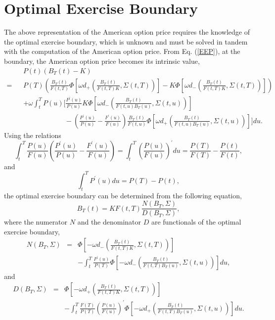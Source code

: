 \documentclass[12pt]{article}
\begin{document}
  \section{Optimal Exercise Boundary}

    The above representation of the American option price requires the knowledge of the optimal
    exercise boundary, which is unknown and must be solved in tandem with the computation of the American
    option price. From Eq. (\ref{EEP}), at the boundary, the American option price becomes its intrinsic
    value,
    \begin{eqnarray}
       \label{Boundary}
       && P(t)\left(B_T(t)-K\right)\nonumber\\
      =&& P(T)\left(\frac{B_T(t)}{F(t,T)}\Phi\left[\omega d_+\left(\frac{B_T(t)}{F(t,T)K},\Sigma(t,T)\right)\right]
                                                      -K\Phi\left[\omega d_-\left(\frac{B_T(t)}{F(t,T)K},\Sigma(t,T)\right)\right]\right)\nonumber\\
       &&+\omega\int_t^TP(u)\Bigg[\frac{P^{\prime}(u)}{P(u)} K
       \Phi\left[\omega d_-\left(\frac{B_T(t)}{F(t,u)B_T(u)}, \Sigma(t,u)\right)\right] \nonumber\\
       &&\quad\quad\quad\quad\quad\quad - \left(\frac{P^{\prime}(u)}{P(u)}-\frac{F^{\prime}(u)}{F(u)}\right)
       \frac{B_T(t)}{F(t,u)}\Phi\left[\omega d_+\left(\frac{B_T(t)}{F(t,u)B_T(u)}, \Sigma(t,u)\right)\right] \Bigg]du.
    \end{eqnarray}
    Using the relations
    \begin{equation}
     \int_t^T \frac{P(u)}{F(u)}\left(\frac{P^{\prime}(u)}{P(u)}-\frac{F^{\prime}(u)}{F(u)}\right)
     = \int_t^T\left(\frac{P(u)}{F(u)}\right)^{\prime}du=\frac{P(T)}{F(T)} - \frac{P(t)}{F(t)},
    \end{equation}
    and
    \begin{equation}
      \int_t^TP^{\prime}(u)du=P(T)-P(t),
    \end{equation}
    the optimal exercise boundary can be determined from the following equation,
    \begin{equation}
      B_T(t)=KF(t,T)\frac{N\left(B_T, \Sigma\right)}{D\left(B_T, \Sigma\right)},
    \end{equation}
    where the numerator $N$ and the denominator $D$ are functionals of the optimal exercise boundary,
    \begin{eqnarray}
      N\left(B_T, \Sigma\right)&=&\Phi\left[-\omega d_-\left(\frac{B_T(t)}{F(t,T)K},\Sigma(t,T)\right)\right]\nonumber\\
      &&-\int_t^T\frac{P^{\prime}(u)}{P(T)}\Phi\left[-\omega d_-\left(\frac{B_T(t)}{F(t,T)B_T(u)},\Sigma(t,u)\right)\right]du,
    \end{eqnarray}
    and
    \begin{eqnarray}
      D\left(B_T, \Sigma\right)&=&\Phi\left[-\omega d_+\left(\frac{B_T(t)}{F(t,T)K},\Sigma(t,T)\right)\right]\nonumber\\
      &&-\int_t^T\frac{F(T)}{P(T)}\left(\frac{P(u)}{F(u)}\right)^{\prime}\Phi\left[-\omega d_+\left(\frac{B_T(t)}{F(t,T)B_T(u)},\Sigma(t,u)\right)\right]du.
    \end{eqnarray}
\end{document}
